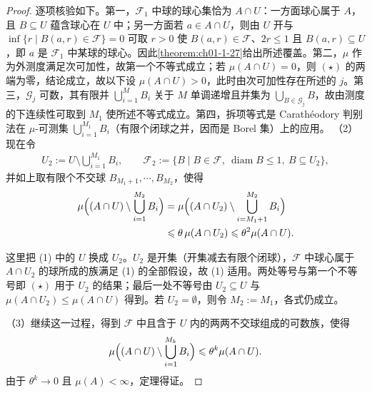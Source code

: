 \documentclass[../../main.tex]{subfiles}%
\begin{document}
\begin{proof}
逐项核验如下。第一，$\mathcal{F}_1$ 中球的球心集恰为 $A\cap U$：一方面球心属于 $A$，且 $B\subseteq U$ 蕴含球心在 $U$ 中；另一方面若 $a\in A\cap U$，则由 $U$ 开与 $\inf\{r\mid B(a,r)\in\mathcal{F}\}=0$ 可取 $r>0$ 使 $B(a,r)\in\mathcal{F}$、$2r\leqslant1$ 且 $B(a,r)\subseteq U$，即 $a$ 是 $\mathcal{F}_1$ 中某球的球心。因此\cref{theorem:ch01-1-27}给出所述覆盖。第二，$\mu$ 作为外测度满足次可加性，故第一个不等式成立；若 $\mu(A\cap U)=0$，则 $(\star)$ 的两端为零，结论成立，故以下设 $\mu(A\cap U)>0$，此时由次可加性存在所述的 $j$。第三，$\mathcal{G}_j$ 可数，其有限并 $\bigcup_{i=1}^{M}B_i$ 关于 $M$ 单调递增且并集为 $\bigcup_{B\in\mathcal{G}_j}B$，故由测度的下连续性可取到 $M_1$ 使所述不等式成立。第四，拆项等式是 Carathéodory 判别法在 $\mu$-可测集 $\bigcup_{i=1}^{M_1}B_i$（有限个闭球之并，因而是 Borel 集）上的应用。%
（2）现在令
\begin{align*}
U_2:=U\setminus\bigcup_{i=1}^{M_1}B_i,\qquad
\mathcal{F}_2:=\{B\mid B\in\mathcal{F},\ \operatorname{diam}B\leqslant1,\ B\subseteq U_2\},
\end{align*}
并如上取有限个不交球 $B_{M_1+1},\cdots,B_{M_2}$，使得
\begin{align*}
\mu\Bigl((A\cap U)\setminus\bigcup_{i=1}^{M_2}B_i\Bigr)
&=\mu\Bigl((A\cap U_2)\setminus\bigcup_{i=M_1+1}^{M_2}B_i\Bigr)\\
&\leqslant\theta\,\mu(A\cap U_2)\leqslant\theta^{2}\mu(A\cap U).
\end{align*}

这里把 (1) 中的 $U$ 换成 $U_2$。$U_2$ 是开集（开集减去有限个闭球），$\mathcal{F}$ 中球心属于 $A\cap U_2$ 的球所成的族满足 (1) 的全部假设，故 (1) 适用。两处等号与第一个不等号即 $(\star)$ 用于 $U_2$ 的结果；最后一处不等号由 $U_2\subseteq U$ 与 $\mu(A\cap U_2)\leqslant\mu(A\cap U)$ 得到。若 $U_2=\emptyset$，则令 $M_2:=M_1$，各式仍成立。

（3）继续这一过程，得到 $\mathcal{F}$ 中且含于 $U$ 内的两两不交球组成的可数族，使得
\begin{align*}
\mu\Bigl((A\cap U)\setminus\bigcup_{i=1}^{M_k}B_i\Bigr)\leqslant\theta^{k}\mu(A\cap U).
\end{align*}
由于 $\theta^{k}\to0$ 且 $\mu(A)<\infty$，定理得证。


\end{proof}
\end{document}
